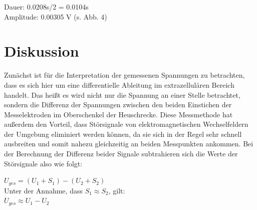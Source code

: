 Dauer: 0.0208s/2 = 0.0104s\\
Amplitude: 0.00305 V (s. Abb. 4)

\section{Diskussion}
Zunächst ist für die Interpretation der gemessenen Spannungen zu betrachten, dass es sich hier um eine differentielle Ableitung im extrazellulären Bereich handelt. Das heißt es wird nicht nur die Spannung an einer Stelle betrachtet, sondern die Differenz der Spannungen zwischen den beiden Einstichen der Messelektroden im Oberschenkel der Heuschrecke. Diese Messmethode hat außerdem den Vorteil, dass Störsignale von elektromagnetischen Wechselfeldern der Umgebung eliminiert werden können, da sie sich in der Regel sehr schnell ausbreiten und somit nahezu gleichzeitig an beiden Messpunkten ankommen. Bei der Berechnung der Differenz beider Signale subtrahieren sich die Werte der Störsignale also wie folgt:
\begin{center}
$U_{ges}= (U_1+S_1) - (U_2 + S_2)$ \\

Unter der Annahme, dass $S_1 \approx S_2$, gilt: \\

$U_{ges} \approx U_1 - U_2$
\end{center}

